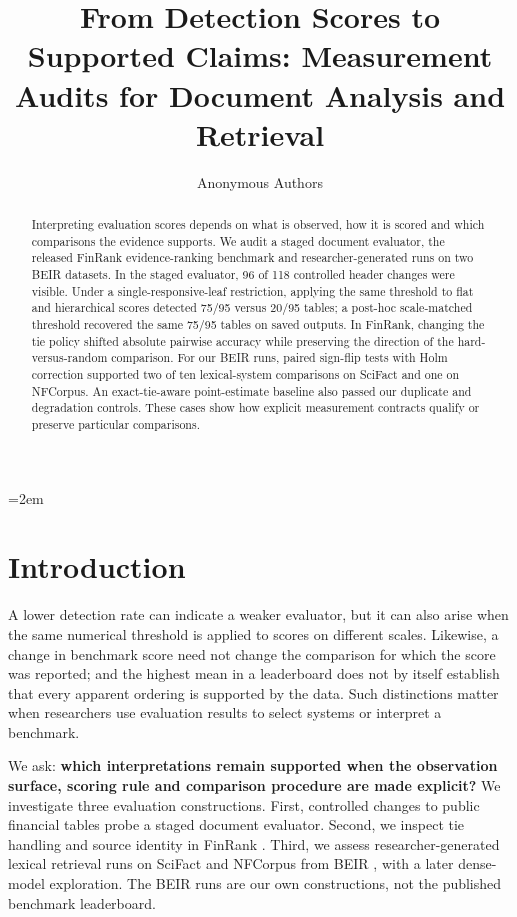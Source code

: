 \documentclass[runningheads]{llncs}
\begin{document}
\emergencystretch=2em
\title{From Detection Scores to Supported Claims: Measurement Audits for
Document Analysis and Retrieval}
\author{Anonymous Authors}
\institute{}
\maketitle
\begin{abstract}
Interpreting evaluation scores depends on what is observed, how it is
scored and which comparisons the evidence supports. We audit a staged
document evaluator, the released FinRank evidence-ranking benchmark and
researcher-generated runs on two BEIR datasets. In the staged evaluator,
96 of 118 controlled header changes were visible. Under a
single-responsive-leaf restriction, applying the same threshold to flat
and hierarchical scores detected 75/95 versus 20/95 tables; a post-hoc
scale-matched threshold recovered the same 75/95 tables on saved
outputs. In FinRank, changing the tie policy shifted absolute pairwise
accuracy while preserving the direction of the hard-versus-random
comparison. For our BEIR runs, paired sign-flip tests with Holm
correction supported two of ten lexical-system comparisons on SciFact
and one on NFCorpus. An exact-tie-aware point-estimate baseline also
passed our duplicate and degradation controls. These cases show how
explicit measurement contracts qualify or preserve particular
comparisons.
\end{abstract}
\section{Introduction}\label{introduction}

A lower detection rate can indicate a weaker evaluator, but it can also
arise when the same numerical threshold is applied to scores on
different scales. Likewise, a change in benchmark score need not change
the comparison for which the score was reported; and the highest mean in
a leaderboard does not by itself establish that every apparent ordering
is supported by the data. Such distinctions matter when researchers use
evaluation results to select systems or interpret a benchmark.

We ask: \textbf{which interpretations remain supported when the
observation surface, scoring rule and comparison procedure are made
explicit?} We investigate three evaluation constructions. First,
controlled changes to public financial tables probe a staged document
evaluator. Second, we inspect tie handling and source identity in
FinRank \cite{r1}. Third, we assess researcher-generated lexical
retrieval runs on SciFact and NFCorpus from BEIR \cite{r2}, with a later
dense-model exploration. The BEIR runs are our own constructions, not
the published benchmark leaderboard.
\end{document}

